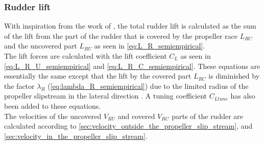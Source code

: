 \subsubsection{Rudder lift}
\label{sec:rudder lift}
With inspiration from the work of \citet{villa_numerical_2020}, the total rudder lift is calculated as the sum of the lift from the part of the rudder that is covered by the propeller race $L_{RC}$ and the uncovered part $L_{RU}$ as seen in \autoref{eq:L_R_semiempirical}.
\begin{equation}
    \label{eq:L_R_semiempirical}
    
\end{equation}
The lift forces are calculated with the lift coefficient $C_L$ as seen in \autoref{eq:L_R_U_semiempirical} and \autoref{eq:L_R_C_semiempirical}. These equations are essentially the same except that the lift by the covered part $L_{RC}$ is diminished by the factor $\lambda_R$ (\autoref{eq:lambda_R_semiempirical}) due to the limited radius of the propeller slipstream in the lateral direction \citep{brix_manoeuvring_1993}. A tuning coefficient $C_{Ltune}$ has also been added to these equations.
\begin{equation}
    \label{eq:L_R_U_semiempirical}
    
\end{equation}
%
\begin{equation}
    \label{eq:L_R_C_semiempirical}
    
\end{equation}
The velocities of the uncovered $V_{RU}$ and covered $V_{RC}$ parts of the rudder are calculated according to \ref{sec:velocity_outside_the_propeller_slip_stream}, and \ref{sec:velocity_in_the_propeller_slip_stream}.

